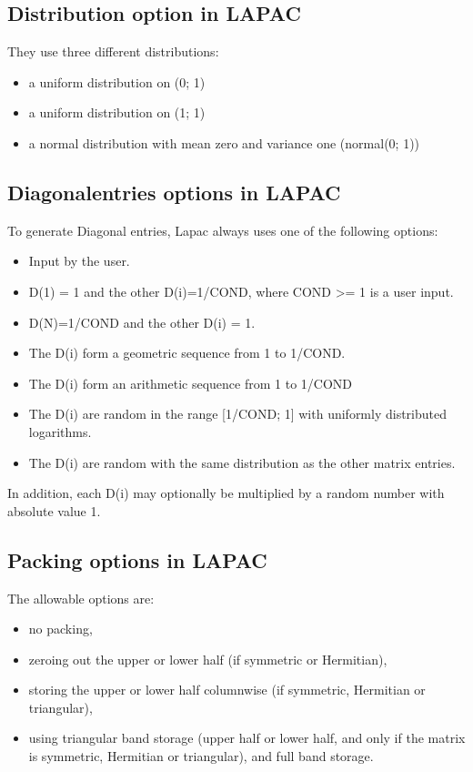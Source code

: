 \documentclass[parskip=full]{scrartcl}
\begin{document}
\subsection{Distribution option in LAPAC}
They use three different distributions:
\begin{itemize}
\item a uniform distribution on (0; 1)
\item a uniform distribution on (1; 1)
\item a normal distribution with mean zero and variance one (normal(0; 1))
\end{itemize}

\subsection{Diagonalentries options in LAPAC}
To generate Diagonal entries, Lapac always uses one of the following options:
\begin{itemize}
	\item Input by the user.
	\item D(1) = 1 and the other D(i)=1/COND, where COND >= 1 is a user input.
	\item D(N)=1/COND and the other D(i) = 1. 
	\item The D(i) form a geometric sequence from 1 to 1/COND. 
	\item The D(i) form an arithmetic sequence from 1 to 1/COND
	\item The D(i) are random in the range [1/COND; 1] with uniformly distributed logarithms. 
	\item The D(i) are random with the same distribution as the other matrix entries.
\end{itemize}
In addition, each D(i) may optionally be multiplied by a random number with absolute value 1.

\subsection{Packing options in LAPAC}
The allowable options are: 
\begin{itemize}
\item no packing, 
\item zeroing out the upper or lower half (if symmetric or Hermitian), 
\item storing the upper or lower half columnwise (if symmetric, Hermitian or triangular), 
\item using triangular band storage (upper half or lower half, and only if the matrix is symmetric, Hermitian or triangular), and full band storage.
\end{itemize}
\end{document}
